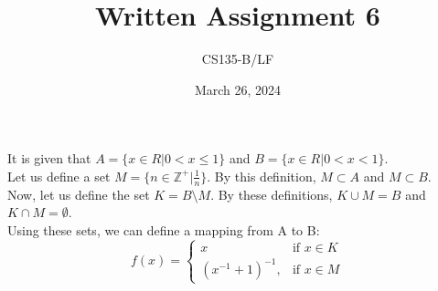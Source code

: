 \documentclass{article}
\title{Written Assignment 6}
\author{CS135-B/LF}
\date{March 26, 2024}
\begin{document}
\maketitle
\raggedright

\section{}
It is given that $A = \{x \in R | 0 < x \leq 1\}$ and $B = \{x \in R | 0 < x < 1\}.$\\
Let us define a set $M = \{ n \in \mathbb{Z}^+ | \frac{1}{n} \}$. By this definition, $M \subset A$ and $M \subset B$. \\
Now, let us define the set $K = B \setminus M$. By these definitions, $K \cup M = B$ and $K \cap M = \emptyset$. \\
Using these sets, we can define a mapping from A to B:
\begin{equation*}
    f(x) = \begin{cases}
        x & \text{if } x \in K\\
        (x^{-1} + 1)^{-1},& \text{if } x \in M
    \end{cases}
\end{equation*}
\end{document}
